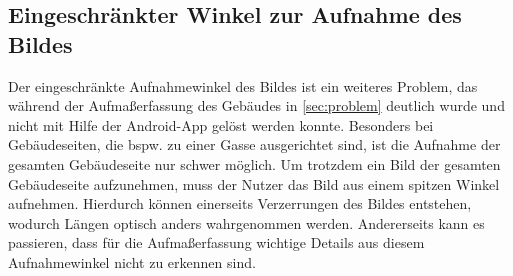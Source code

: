 \subsection{Eingeschränkter Winkel zur Aufnahme des Bildes}
Der eingeschränkte Aufnahmewinkel des Bildes ist ein weiteres Problem, das während der Aufmaßerfassung des Gebäudes in \autoref{sec:problem} deutlich wurde und nicht mit Hilfe der Android-App gelöst werden konnte.
Besonders bei Gebäudeseiten, die bspw. zu einer Gasse ausgerichtet sind, ist die Aufnahme der gesamten Gebäudeseite nur schwer möglich.
Um trotzdem ein Bild der gesamten Gebäudeseite aufzunehmen, muss der Nutzer das Bild aus einem spitzen Winkel aufnehmen.
Hierdurch können einerseits Verzerrungen des Bildes entstehen, wodurch Längen optisch anders wahrgenommen werden.
Andererseits kann es passieren, dass für die Aufmaßerfassung wichtige Details aus diesem Aufnahmewinkel nicht zu erkennen sind.

